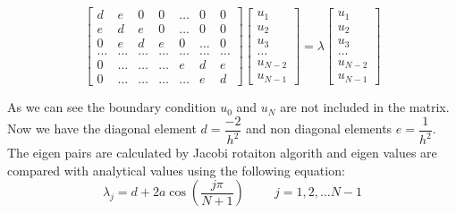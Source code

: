 \documentclass{article}
\begin{document}
\begin{equation}
    \begin{bmatrix} d& e & 0   & 0    & \dots  &0     & 0 \\
                                e & d & e & 0    & \dots  &0     &0 \\
                                0   & e & d & e  &0       &\dots & 0\\
                                \dots  & \dots & \dots & \dots  &\dots      &\dots & \dots\\
                                0   & \dots & \dots & \dots  &e  &d & e\\
                                0   & \dots & \dots & \dots  &\dots       &e & d\end{bmatrix}
                                 \begin{bmatrix} u_1 \\ u_2 \\ u_3 \\ \dots \\ u_{N-2} \\ u_{N-1}\end{bmatrix} = \lambda \begin{bmatrix} u_1 \\ u_2 \\ u_3 \\ \dots \\ u_{N-2} \\ u_{N-1}\end{bmatrix}
\label{eq:matrixse}
\end{equation}

As we can see the boundary condition $u_0$ and $u_N$ are not included in the matrix. Now we have the diagonal element $d=\dfrac{-2}{h^2}$ and non diagonal elements $ e = \dfrac{1}{h^2}$.
The eigen pairs are calculated by Jacobi rotaiton algorith and eigen values are compared with analytical  values using the following equation:
\begin{equation}
\lambda_j = d+2a\cos{(\frac{j\pi}{N+1})} \hspace{1cm} j=1,2,\dots N-1
\end{equation}
\end{document}
